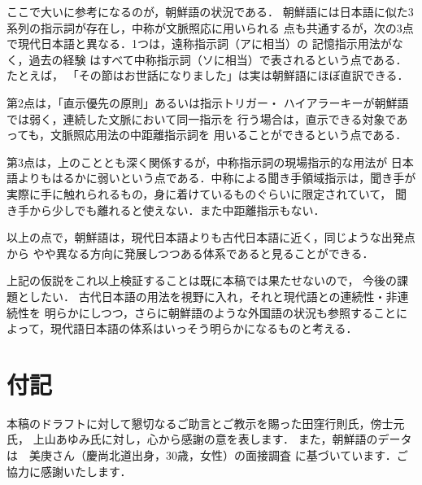 ここで大いに参考になるのが，朝鮮語の状況である．
朝鮮語には日本語に似た3系列の指示詞が存在し，中称が文脈照応に用いられる
点も共通するが，次の3点で現代日本語と異なる．1つは，遠称指示詞（アに相当）の
記憶指示用法がなく，過去の経験
はすべて中称指示詞（ソに相当）で表されるという点である．たとえば，
「その節はお世話になりました」は実は朝鮮語にほぼ直訳できる．

第2点は，「直示優先の原則」あるいは指示トリガー・
ハイアラーキーが朝鮮語では弱く，連続した文脈において同一指示を
行う場合は，直示できる対象であっても，文脈照応用法の中距離指示詞を
用いることができるという点である．

第3点は，上のこととも深く関係するが，中称指示詞の現場指示的な用法が
日本語よりもはるかに弱いという点である．中称による聞き手領域指示は，聞き手が
実際に手に触れられるもの，身に着けているものぐらいに限定されていて，
聞き手から少しでも離れると使えない．また中距離指示もない．

以上の点で，朝鮮語は，現代日本語よりも古代日本語に近く，同じような出発点から
やや異なる方向に発展しつつある体系であると見ることができる．

上記の仮説をこれ以上検証することは既に本稿では果たせないので，
今後の課題としたい．
古代日本語の用法を視野に入れ，それと現代語との連続性・非連続性を
明らかにしつつ，さらに朝鮮語のような外国語の状況も参照することに
よって，現代語日本語の体系はいっそう明らかになるものと考える．


\section*{付記}
本稿のドラフトに対して懇切なるご助言とご教示を賜った田窪行則氏，傍士元氏，
上山あゆみ氏に対し，心から感謝の意を表します．
また，朝鮮語のデータは　美庚さん（慶尚北道出身，30歳，女性）の面接調査
に基づいています．ご協力に感謝いたします．




\begin{biography}


\end{biography}



